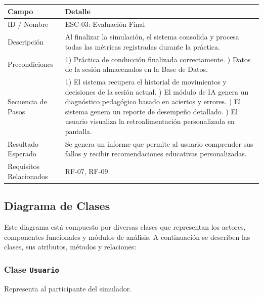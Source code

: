 \documentclass[12pt]{article}
\begin{document}
	\begin{longtable}{|p{4cm}|p{10cm}|}
		\hline
		\textbf{Campo} & \textbf{Detalle} \\ \hline
		
		ID / Nombre & ESC-03: Evaluación Final \\ \hline
		
		Descripción &
		Al finalizar la simulación, el sistema consolida y procesa todas las métricas registradas durante la práctica. \\ \hline
		
		Precondiciones &
		1) Práctica de conducción finalizada correctamente. \newline
		2) Datos de la sesión almacenados en la Base de Datos. \\ \hline
		
		Secuencia de Pasos &
		1) El sistema recupera el historial de movimientos y decisiones de la sesión actual. \newline
		2) El módulo de IA genera un diagnóstico pedagógico basado en aciertos y errores. \newline
		3) El sistema genera un reporte de desempeño detallado. \newline
		4) El usuario visualiza la retroalimentación personalizada en pantalla. \\ \hline
		
		Resultado Esperado &
		Se genera un informe que permite al usuario comprender sus fallos y recibir recomendaciones educativas personalizadas. \\ \hline
		
		Requisitos Relacionados &
		RF-07, RF-09 \\ \hline
		
	\end{longtable}
	
	
	
	\subsection{Diagrama de Clases}
	
	Este diagrama está compuesto por diversas clases que representan los actores, componentes funcionales y módulos de análisis. A continuación se describen las clases, sus atributos, métodos y relaciones:
	
	\subsubsection*{Clase \texttt{Usuario}}
	Representa al participante del simulador.
	
\end{document}
